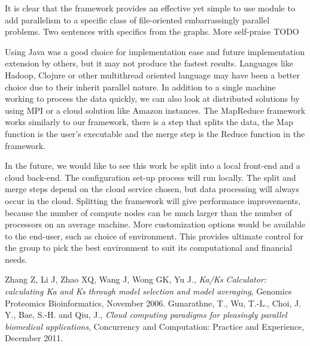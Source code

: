 \documentclass[12pt]{article}
\begin{document}
It is clear that the framework provides an effective yet simple to use module to
add parallelism to a specific class of file-oriented embarrassingly parallel
problems. Two sentences with specifics from the graphs. More self-praise TODO

Using Java was a good choice for implementation ease and future implementation
extension by others, but it may not produce the fastest results. Languages like
Hadoop, Clojure or other multithread oriented language may have been a better
choice due to their inherit parallel nature. In addition to a single machine
working to process the data quickly, we can also look at distributed solutions
by using MPI or a cloud solution like Amazon instances. The MapReduce framework
works similarly to our framework, there is a step that splits the data, the Map
function is the user's executable and the merge step is the Reduce function in
the framework. 

In the future, we would like to see this work be split into a local front-end
and a cloud back-end. The configuration set-up process will run locally. The
split and merge steps depend on the cloud service chosen, but data processing
will always occur in the cloud. Splitting the framework will give performance
improvements, because the number of compute nodes can be much larger than the
number of processors on an average machine. More customization options would be
available to the end-user, such as choice of environment. This provides ultimate
control for the group to pick the best environment to suit its computational and
financial needs.

\begin{thebibliography}{1}
Zhang Z, Li J, Zhao XQ, Wang J, Wong GK, Yu J., \emph{Ka/Ks Calculator: 
calculating Ka and Ks through model selection and model averaging},
Genomics Proteomics Bioinformatics, November 2006.
Gunarathne, T., Wu, T.-L., Choi, J. Y., Bae, S.-H. and Qiu, J., \emph{Cloud
computing paradigms for pleasingly parallel biomedical applications},
Concurrency and Computation: Practice and Experience, December 2011.
\end{thebibliography}
\end{document}
